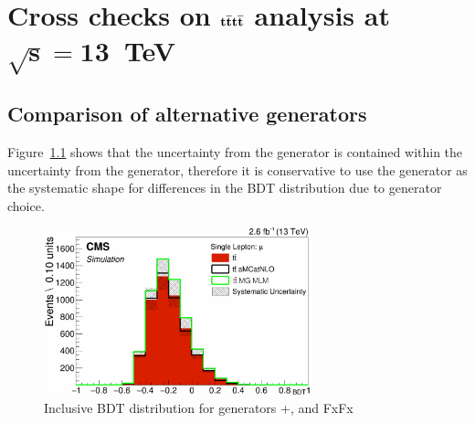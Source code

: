 \appendix

\chapter{Cross checks on \runtwo $\boldsymbol{\mathrm{t}\overline{\mathrm{t}}\mathrm{t}\overline{\mathrm{t}}}$ analysis at $\boldsymbol{\sqrt{s}=13}$~TeV}






\section{Comparison of alternative \ttbar generators \label{app:ttbargen}}

Figure~\ref{fig:MGFXFX} shows that the uncertainty from the \MADGRAPH \aMCATNLO generator is contained within the uncertainty from the \MLM generator, therefore it is conservative to use the \MLM generator as the systematic shape for differences in the BDT distribution due to generator choice.

\begin{figure}[ht]
\centering
    \includegraphics[width=0.7\textwidth]{images/Run2/MG_FXFX.pdf}
    \caption{Inclusive BDT distribution for \ttbar generators \POWHEG+\PYTHIA, \MLM and \MADGRAPH \aMCATNLO FxFx}
    \label{fig:MGFXFX}
\end{figure} 


